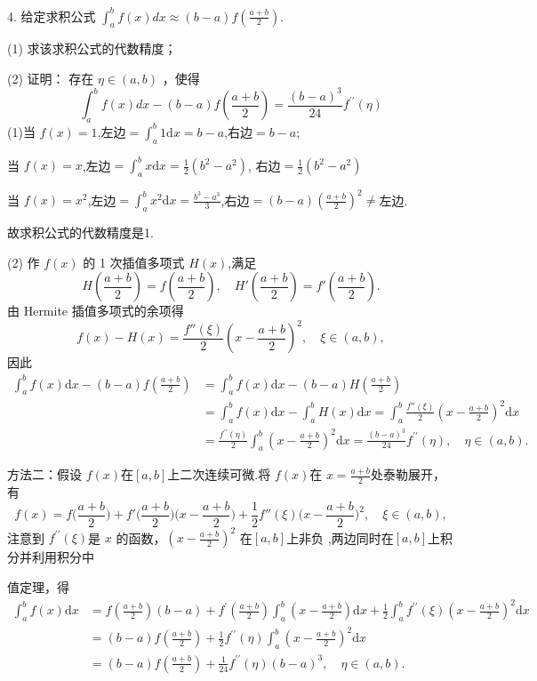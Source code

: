 \begin{tcolorbox}[enhanced,colback=10,colframe=9,breakable,coltitle=green!25!black,title=2024]

4. 给定求积公式 $\displaystyle \int_{a}^{b} f(x) d x \approx(b-a) f\left(\frac{a+b}{2}\right) $.

(1) 求该求积公式的代数精度；

(2) 证明： 存在 $ \eta \in(a, b) $ ，使得
$$
\int_{a}^{b} f(x) d x-(b-a) f\left(\frac{a+b}{2}\right)=\frac{(b-a)^{3}}{24} f^{\prime \prime}(\eta)
$$
\tcblower
(1)当 $f(x)=1$,左边$=\int_a^b1 \mathrm{d}x=b-a$,右边$=b-a$;


当 $f(x)=x$,左边$=\int_a^bx \mathrm{d}x=\frac12(b^2-a^2)$, 右边$=\frac12(b^2-a^2)$

当 $f(x)=x^{2}$,左边$=\int_{a}^{b}x^{2} \mathrm{d}x=\frac{b^{3}-a^{3}}{3}$,右边$=(b-a)\left(\frac{a+b}{2}\right)^{2}\neq$左边. 

故求积公式的代数精度是1. 

(2) 作 $f(x)$ 的 1 次插值多项式 $H(x)$,满足 
$$H\left(\frac{a+b}{2}\right)=f\left(\frac{a+b}{2}\right),\quad H'\left(\frac{a+b}{2}\right)=f'\left(\frac{a+b}{2}\right).$$
由 Hermite 插值多项式的余项得
$$f(x)-H(x)=\frac{f''(\xi)}{2}\left(x-\frac{a+b}{2}\right)^{2},\quad\xi\in(a,b), $$
因此 
$$\begin{aligned}
\int_a^bf(x) \mathrm{d}x-(b-a)f\left(\frac{a+b}2\right) 
&=\int_a^bf(x) \mathrm{d}x-(b-a)H\left(\frac{a+b}2\right) \\
&=\int_a^bf(x) \mathrm{d}x-\int_a^bH(x) \mathrm{d}x=\int_a^b\frac{f''(\xi)}{2}\left(x-\frac{a+b}{2}\right)^2 \mathrm{d}x \\
&=\frac{f^{\prime\prime}(\eta)}2\int_a^b\left(x-\frac{a+b}2\right)^2 \mathrm{d}x=\frac{(b-a)^3}{24}f^{\prime\prime}(\eta),\quad\eta\in(a,b).
\end{aligned}$$

方法二：假设 $f(x)$在$[a,b]$上二次连续可微.将 $f(x)$在 $x=\frac{a+b}2$处泰勒展开，有
$$f(x)=f\Big(\frac{a+b}{2}\Big)+f'\Big(\frac{a+b}{2}\Big)\Big(x-\frac{a+b}{2}\Big)+\frac{1}{2}f''(\xi)\Big(x-\frac{a+b}{2}\Big)^{2},\quad\xi\in(a,b),$$
注意到 $f^{\prime\prime}(\xi)$是 $x$ 的函数，$\left(x-\frac {a+b}{2}\right)^2$ 在$[a,b]$上非负 ,两边同时在$[a,b]$上积分并利用积分中

值定理，得
$$\begin{aligned}\int_{a}^{b}f\left(x\right)\mathrm{d}x&=f\left(\frac{a+b}{2}\right)(b-a)+f^{\prime}\left(\frac{a+b}{2}\right)\int_{a}^{b}\left(x-\frac{a+b}{2}\right)\mathrm{d}x+\frac{1}{2}\int_{a}^{b}f^{\prime\prime}(\xi)\left(x-\frac{a+b}{2}\right)^{2}\mathrm{d}x\\&=(b-a)f\left(\frac{a+b}{2}\right)+\frac{1}{2}f^{\prime\prime}(\eta)\int_{a}^{b}\left(x-\frac{a+b}{2}\right)^{2}\mathrm{d}x\\&=(b-a)f\left(\frac{a+b}{2}\right)+\frac{1}{24}f^{\prime\prime}(\eta)(b-a)^{3},\quad\eta\in(a,b).\end{aligned}$$


  \end{tcolorbox}

